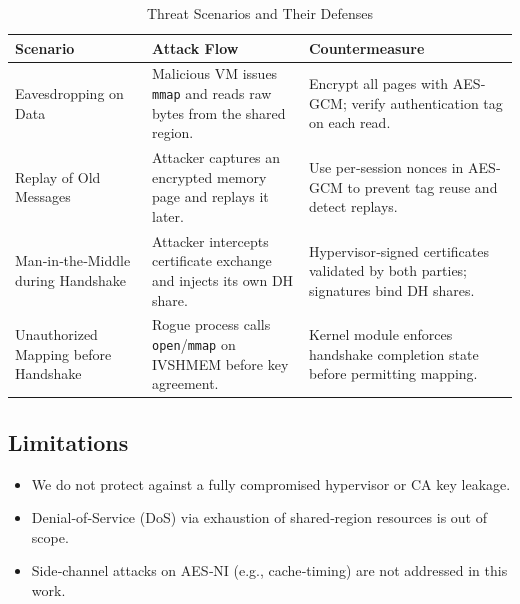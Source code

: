 \documentclass[conference]{IEEEtran}
\begin{document}
\begin{table}[!t]
  \centering
  \begin{tabular}{p{4cm} p{7cm} p{6cm}}
    \toprule
    \textbf{Scenario}                                                                & \textbf{Attack Flow} & \textbf{Countermeasure} \\
    \midrule
    Eavesdropping on Data                                                            &
    Malicious VM issues \texttt{mmap} and reads raw bytes from the shared region.    &
    Encrypt all pages with AES‐GCM; verify authentication tag on each read.                                                           \\
    \addlinespace
    Replay of Old Messages                                                           &
    Attacker captures an encrypted memory page and replays it later.                 &
    Use per‐session nonces in AES‐GCM to prevent tag reuse and detect replays.                                                        \\
    \addlinespace
    Man‐in‐the‐Middle during Handshake                                               &
    Attacker intercepts certificate exchange and injects its own DH share.           &
    Hypervisor‐signed certificates validated by both parties; signatures bind DH shares.                                              \\
    \addlinespace
    Unauthorized Mapping before Handshake                                            &
    Rogue process calls \texttt{open}/\texttt{mmap} on IVSHMEM before key agreement. &
    Kernel module enforces handshake completion state before permitting mapping.                                                      \\
    \bottomrule
  \end{tabular}
  \caption{Threat Scenarios and Their Defenses}
\end{table}

\subsection{Limitations}
\begin{itemize}
  \item We do not protect against a fully compromised hypervisor or CA key leakage.
  \item Denial‐of‐Service (DoS) via exhaustion of shared‐region resources is out of
        scope.
  \item Side‐channel attacks on AES‐NI (e.g., cache‐timing) are not addressed in this
        work.
\end{itemize}
\end{document}
